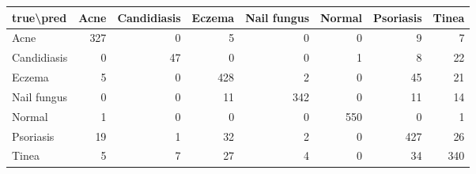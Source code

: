 \begin{tabular}{lrrrrrrr}
\toprule
true\textbackslash pred & Acne & Candidiasis & Eczema & Nail fungus & Normal & Psoriasis & Tinea \\
\midrule
Acne & 327 & 0 & 5 & 0 & 0 & 9 & 7 \\
Candidiasis & 0 & 47 & 0 & 0 & 1 & 8 & 22 \\
Eczema & 5 & 0 & 428 & 2 & 0 & 45 & 21 \\
Nail fungus & 0 & 0 & 11 & 342 & 0 & 11 & 14 \\
Normal & 1 & 0 & 0 & 0 & 550 & 0 & 1 \\
Psoriasis & 19 & 1 & 32 & 2 & 0 & 427 & 26 \\
Tinea & 5 & 7 & 27 & 4 & 0 & 34 & 340 \\
\bottomrule
\end{tabular}
